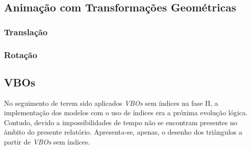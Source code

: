 \documentclass[relatorio.tex]{subfiles}
\begin{document}
\subsection{Animação com Transformações Geométricas}

\subsubsection{Translação} \label{subsub:transl}

\subsubsection{Rotação} \label{subsub:rot}
\subsection{VBOs} \label{subsec:VBO}
No seguimento de terem sido aplicados \textit{VBOs} sem índices na fase II, a implementação dos 
modelos com o uso de índices era a próxima evolução lógica. 
Contudo, devido a impossibilidades de tempo não se encontram presentes no âmbito do 
presente relatório. 
Apresenta-se, apenas, o desenho dos triângulos a partir de \textit{VBOs} sem índices.
    
\end{document}
